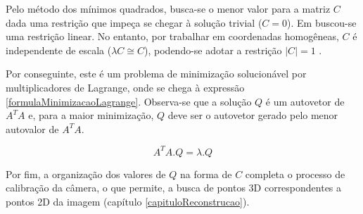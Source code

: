	Pelo método dos mínimos quadrados, busca-se o menor valor para a matriz $C$ dada uma restrição que impeça se chegar à solução trivial ($C = 0$). Em \cite{juizVirtual} buscou-se uma restrição linear. No entanto, por trabalhar em coordenadas homogêneas, $C$ é independente de escala ($\lambda C \cong C$), podendo-se adotar a restrição $|C| = 1$ \cite{lectureCameraCalibration}.
	
	Por conseguinte, este é um problema de minimização solucionável por multiplicadores de Lagrange, onde se chega à expressão \ref{formulaMinimizacaoLagrange}. Observa-se que a solução $Q$ é um autovetor de $A^TA$ e, para a maior minimização, $Q$ deve ser o autovetor gerado pelo menor autovalor de $A^TA$. \cite{lectureLeastSquares}
	
	\begin{equation}
		\label{formulaMinimizacaoLagrange}
		A^TA . Q = \lambda . Q
	\end{equation}
	
	Por fim, a organização dos valores de $Q$ na forma de $C$ completa o processo de calibração da câmera, o que permite, a busca de pontos 3D correspondentes a pontos 2D da imagem (capítulo \ref{capituloReconstrucao}).
